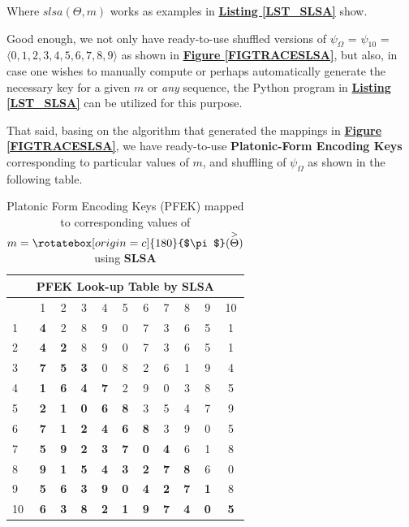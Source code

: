 \documentclass[a4paper, 18pt]{book} %
\newcommand{\invpi}{\rotatebox[origin=c]{180}{$\pi$}}
\begin{document}
\begin{appendices}
Where $slsa(\Theta,m)$ works as examples in \textbf{\hyperref[LST_SLSA]{Listing \ref{LST_SLSA}}} show. 

Good enough, we not only have ready-to-use shuffled versions of $\psi_\Omega$ = $\psi_{10}$ = $\langle 0, 1, 2, 3, 4, 5, 6, 7, 8, 9 \rangle$ as shown in \textbf{\hyperref[FIGTRACESLSA]{Figure \ref{FIGTRACESLSA}}}, but also, in case one wishes to manually compute or perhaps automatically generate the necessary key for a given $m$ or \textit{any} sequence, the Python program in \textbf{\hyperref[LST_SLSA]{Listing \ref{LST_SLSA}}} can be utilized for this purpose.
 

That said, basing on the algorithm that generated the mappings in \textbf{\hyperref[FIGTRACESLSA]{Figure \ref{FIGTRACESLSA}}}, we have ready-to-use \textbf{Platonic-Form Encoding Keys} corresponding to particular values of $m$, and shuffling of $\psi_{\Omega}$ as shown in the following table.\\


 
\begin{table}[H]
  \centering
  \Large
	\begin{tabular}[t]{|p{6cm}||c|c|c|c|c|c|c|c|c|c|}
	\hline
	\multicolumn{11}{|c|}{\textbf{PFEK Look-up Table by SLSA}}\\
	\hline
	\hline
	\diagbox{$m = \invpi(\overset{>}{\Theta})$}{$I(\omega_i,\overset{>}{\Theta})$} & 1 & 2 & 3 & 4 & 5 & 6 & 7 & 8 & 9 & 10\\
	\hline
	\hline
	1 & \textbf{4} & 2 & 8 & 9 & 0 & 7 & 3 & 6 & 5 & 1\\ 
	\hline
	2 & \textbf{4} & \textbf{2} & 8 & 9 & 0 & 7 & 3 & 6 & 5 & 1\\ 
	\hline
	3 & \textbf{7} & \textbf{5} & \textbf{3} & 0 & 8 & 2 & 6 & 1 & 9 & 4\\ 
	\hline
	4 & \textbf{1} & \textbf{6} & \textbf{4} & \textbf{7} & 2 & 9 & 0 & 3 & 8 & 5\\ 
	\hline
	5 & \textbf{2} & \textbf{1} & \textbf{0} & \textbf{6} & \textbf{8} & 3 & 5 & 4 & 7 & 9\\ 
	\hline
	6 & \textbf{7} & \textbf{1} & \textbf{2} & \textbf{4} & \textbf{6} & \textbf{8} & 3 & 9 & 0 & 5\\ 
	\hline
	7 & \textbf{5} & \textbf{9} & \textbf{2} & \textbf{3} & \textbf{7} & \textbf{0} & \textbf{4} & 6 & 1 & 8\\ 
	\hline
	8 & \textbf{9} & \textbf{1} & \textbf{5} & \textbf{4} & \textbf{3} & \textbf{2} & \textbf{7} & \textbf{8} & 6 & 0\\ 
	\hline
	9 & \textbf{5} & \textbf{6} & \textbf{3} & \textbf{9} & \textbf{0} & \textbf{4} & \textbf{2} & \textbf{7} & \textbf{1} & 8\\ 
	\hline
	10 & \textbf{6} & \textbf{3} & \textbf{8} & \textbf{2} & \textbf{1} & \textbf{9} & \textbf{7} & \textbf{4} & \textbf{0} & \textbf{5}\\
	              \hline
\end{tabular}
 \caption{Platonic Form Encoding Keys (PFEK) mapped to corresponding values of $m = \invpi(\overset{>}{\Theta})$ using \textbf{SLSA}}
  \label{TABSSLAPERK}
\end{table}



\end{appendices}
\end{document}
